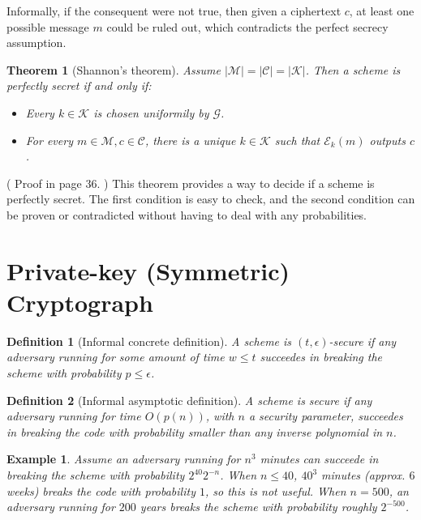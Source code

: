 \documentclass[a4paper, 12pt]{article}
\newtheorem{example}{Example}
\newtheorem{theorem}{Theorem}
\newtheorem{example}{Example} \newtheorem{definition}{Definition}
\newtheorem{theorem}{Theorem}
\begin{document}
Informally, if the consequent were not true,
then given a ciphertext $c$, at least one possible message $m$
could be ruled out, which contradicts the perfect secrecy 
assumption.



\begin{theorem}[Shannon's theorem]
    Assume $\left| \mathcal{M} \right| = \left| \mathcal{C} \right| = \left| \mathcal{K} \right| $. Then a scheme is perfectly secret if and only if: 

    \begin{itemize}
        \item Every $k \in \mathcal{K}$ is chosen uniformily by $\mathcal{G}$.
        \item For every $m \in \mathcal{M}, c \in \mathcal{C}$,
            there is a unique $k \in \mathcal{K}$ such that 
            $\mathcal{E}_k(m)$ outputs $c$.
    \end{itemize}
\end{theorem}

( Proof in page 36. ) This theorem provides a way to decide if a scheme 
is perfectly secret. The first condition is easy to check, and the second condition 
can be proven or contradicted without having to deal with any 
probabilities.

\pagebreak

\section{Private-key (Symmetric) Cryptograph}

\begin{definition}[Informal concrete definition]
    A scheme is $(t, \epsilon)$-secure if any adversary running 
    for some amount of time $w \leq t$ succeedes in breaking the 
    scheme with probability $p \leq \epsilon$.
\end{definition}

\begin{definition}[Informal asymptotic definition]
    A scheme is secure if any adversary running for time 
    $O(p(n))$, with $n$ a security parameter,
    succeedes in breaking the code with probability 
    smaller than any inverse polynomial in $n$.
\end{definition}

\begin{example}
    Assume an adversary running for $n^3$ minutes can succeede 
    in breaking the scheme with probability $2^{40} 2^{-n}$.
    When $n \leq 40$, $40^3$ minutes (approx. $6$ weeks)
    breaks the code with probability $1$, so this is not 
    useful. When $n = 500$, an adversary running for 
    $200$ years breaks the scheme with probability roughly 
    $2^{-500}$.
\end{example}
\end{document}
